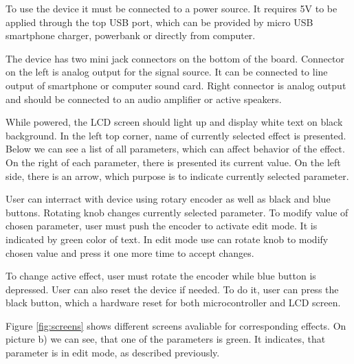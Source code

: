 \documentclass[a4paper,twoside,12pt]{book}
\begin{document}
To use the device it must be connected to a power source.
It requires 5V to be applied through the top USB port,
which can be provided by micro USB smartphone charger,
powerbank or directly from computer.

The device has two mini jack connectors on the bottom of the board.
Connector on the left is analog output for the signal source.
It can be connected to line output of smartphone or computer sound card.
Right connector is analog output and should be connected
to an audio amplifier or active speakers.

While powered, the LCD screen should light up
and display white text on black background.
In the left top corner, name of currently selected effect is presented.
Below we can see a list of all parameters,
which can affect behavior of the effect.
On the right of each parameter, there is presented its current value.
On the left side, there is an arrow,
which purpose is to indicate currently selected parameter.

User can interract with device using rotary encoder
as well as black and blue buttons.
Rotating knob changes currently selected parameter.
To modify value of chosen parameter, user must push the encoder
to activate edit mode. It is indicated by green color of text.
In edit mode use can rotate knob to modify chosen value
and press it one more time to accept changes.

To change active effect, user must rotate the encoder
while blue button is depressed. User can also reset the device if needed.
To do it, user can press the black button,
which a hardware reset for both microcontroller and LCD screen.

Figure \ref{fig:screens} shows different screens
avaliable for corresponding effects.
On picture b) we can see, that one of the parameters is green.
It indicates, that parameter is in edit mode, as described previously.
\end{document}
